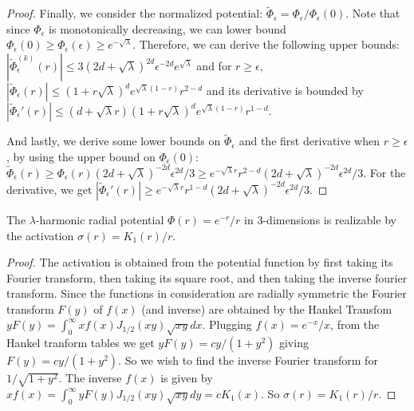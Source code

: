 \begin{proof}
Finally, we consider the normalized potential: $\widetilde{\Phi}_\epsilon = {\Phi}_\epsilon/{\Phi}_\epsilon(0)$. Note that since ${\Phi}_\epsilon$ is monotonically decreasing, we can lower bound ${\Phi}_\epsilon(0) \geq {\Phi}_\epsilon(\epsilon) \geq e^{-\sqrt{\lambda}}$. Therefore, we can derive the following upper bounds: $|\widetilde{\Phi}_\epsilon^{(k)}(r)| \leq 3(2d + \sqrt{\lambda})^{2d} \epsilon^{-2d}e^{\sqrt{\lambda}}$ and for $r \geq \epsilon$, $|\widetilde{\Phi}_\epsilon(r)| \leq (1+r\sqrt{\lambda})^de^{\sqrt{\lambda}(1-r)}r^{2-d}$ and its derivative is bounded by $|\widetilde{\Phi}_\epsilon'(r)| \leq (d+\sqrt{\lambda}r)(1+ r\sqrt{\lambda})^de^{\sqrt{\lambda}(1- r)} r^{1-d}$.


And lastly, we derive some lower bounds on $\widetilde{\Phi}_\epsilon$ and the first derivative when $r \geq \epsilon$, by using the upper bound on $\Phi_\epsilon(0)$: $\widetilde{\Phi}_\epsilon(r) \geq {\Phi}_\epsilon(r)(2d+\sqrt{\lambda})^{-2d}\epsilon^{2d}/3  \geq e^{-\sqrt{\lambda}r}r^{2-d}(2d+\sqrt{\lambda})^{-2d}\epsilon^{2d}/3$. For the derivative, we get
 $|\widetilde{\Phi}_\epsilon'(r)| \geq e^{-\sqrt{\lambda}r}r^{1-d}(2d+\sqrt{\lambda})^{-2d}\epsilon^{2d}/3$.
\end{proof}


\begin{lemma}\label{3dlambdaharmonic}
The $\lambda$-harmonic radial potential $\Phi(r) = e^{-r}/r$ in $3$-dimensions is realizable by the activation 
$\sigma(r) = K_1(r)/r$.
\end{lemma}

\begin{proof}
The activation is obtained from the potential function by first taking its Fourier transform, then taking its square root, and then taking the inverse fourier transform. Since the functions in consideration are radially symmetric the Fourier transform $F(y)$ of $f(x)$ (and inverse) are obtained by the Hankel Transfom $y F(y) = \int_0^\infty x f(x) J_{1/2} (xy) \sqrt{xy} dx$. Plugging $f(x) = e^{-x}/x$, from the Hankel tranform tables we get $yF(y) = cy/(1+y^2)$ giving $F(y) = cy/(1+y^2)$. So we wish to find the inverse Fourier transform for $1/\sqrt{1+y^2}$. The inverse $f(x)$ is given by $xf(x) = \int_0^\infty y F(y) J_{1/2} (xy) \sqrt{xy} dy = cK_1(x)$. So $\sigma(r) = K_1(r)/r$.
\end{proof}

